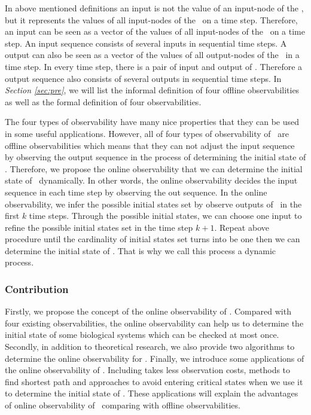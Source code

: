 In above mentioned definitions an input is not the value of an input-node of the \BCN, but it represents the values of all input-nodes of the \BCN\ on a time step. Therefore, an input can be seen as a vector of the values of all input-nodes of the \BCN\ on a time step. An input sequence consists of several inputs in sequential time steps.
     A output can also be seen as a vector of the values of all output-nodes of the \BCN\ in a time step. In every time step, there is a pair of input and output of \BCN. Therefore a output sequence also consists of several outputs in sequential time steps. In {\em Section \ref{sec:pre}}, we will list the informal definition of four offline  observabilities as well as the formal definition of four observabilities.%
 
The four  types of observability  have many nice properties that they can be used in some useful applications. However, all of four  types of observability of \BCNs\ are offline observabilities which means that they can not adjust the input sequence by observing the output sequence in the process of determining the initial state of \BCNs. Therefore, we propose the online observability that we can determine the initial state of \BCNs\ dynamically. In other words,  the online observability decides the input sequence in each time step by observing the out sequence. In the  online observability, we infer the possible  initial states set by observe outputs of \BCN\ in the first $k$ time steps. Through the  possible  initial states, we can choose one input to refine the possible initial states set in the time step $k+1$. Repeat above procedure until the cardinality of initial states set turns into be one then we can determine the initial state of \BCNs. That is why we call this process a dynamic process. 

\subsubsection*{Contribution}
Firstly, we propose the concept of the online observability of \BCNs. Compared with four existing observabilities, the online observability can help us to determine the initial state of some biological systems which can be checked at most once. Secondly, in addition to theoretical research, we also provide two algorithms to determine the online observability for \BCNs. Finally, we introduce some applications of the online observability of \BCNs. Including takes less observation costs, methods to find shortest path and approaches to avoid entering critical states when we use it to determine the initial state of \BCNs.  These applications will explain the advantages of online observability of \BCNs\ comparing with offline observabilities. %
